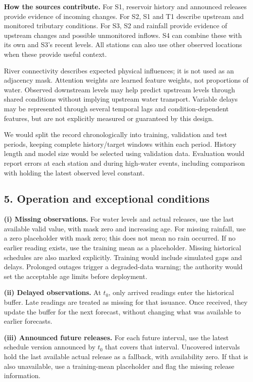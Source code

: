 \textbf{How the sources contribute.} For S1, reservoir history and announced releases provide evidence of incoming changes. For S2, S1 and T1 describe upstream and monitored tributary conditions. For S3, S2 and rainfall provide evidence of upstream changes and possible unmonitored inflows. S4 can combine these with its own and S3's recent levels. All stations can also use other observed locations when these provide useful context.

River connectivity describes expected physical influences; it is not used as an adjacency mask. Attention weights are learned feature weights, not proportions of water. Observed downstream levels may help predict upstream levels through shared conditions without implying upstream water transport. Variable delays may be represented through several temporal lags and condition-dependent features, but are not explicitly measured or guaranteed by this design.

We would split the record chronologically into training, validation and test periods, keeping complete history/target windows within each period. History length and model size would be selected using validation data. Evaluation would report errors at each station and during high-water events, including comparison with holding the latest observed level constant.

\clearpage
\subsection*{5. Operation and exceptional conditions}
\textbf{(i) Missing observations.} For water levels and actual releases, use the last available valid value, with mask zero and increasing age. For missing rainfall, use a zero placeholder with mask zero; this does not mean no rain occurred. If no earlier reading exists, use the training mean as a placeholder. Missing historical schedules are also marked explicitly. Training would include simulated gaps and delays. Prolonged outages trigger a degraded-data warning; the authority would set the acceptable age limits before deployment.

\textbf{(ii) Delayed observations.} At $t_0$, only arrived readings enter the historical buffer. Late readings are treated as missing for that issuance. Once received, they update the buffer for the next forecast, without changing what was available to earlier forecasts.

\textbf{(iii) Announced future releases.} For each future interval, use the latest schedule version announced by $t_0$ that covers that interval. Uncovered intervals hold the last available actual release as a fallback, with availability zero. If that is also unavailable, use a training-mean placeholder and flag the missing release information.


